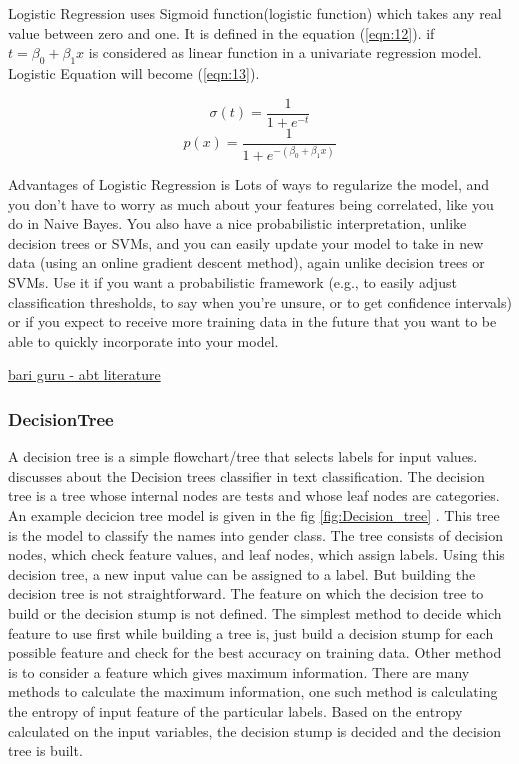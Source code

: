Logistic Regression uses Sigmoid function(logistic function) which takes any real value between zero and one. It is defined in the equation (\ref{eqn:12}). if $t= \beta_0 + \beta_1x$ is considered as linear function in a univariate regression model. Logistic Equation will become (\ref{eqn:13}). 




\begin{equation}
\label{eqn:12}
\sigma(t) = \frac{1}{1+e^{-t}}
\end{equation}
\begin{equation}
\label{eqn:13}
p(x) = \frac{1}{1 + e^{-(\beta_0 + \beta_1x)}}
\end{equation}



Advantages of Logistic Regression is Lots of ways to regularize the model, and you don’t have to worry as much about your features being correlated, like you do in Naive Bayes. You also have a nice probabilistic interpretation, unlike decision trees or SVMs, and you can easily update your model to take in new data (using an online gradient descent method), again unlike decision trees or SVMs. Use it if you want a probabilistic framework (e.g., to easily adjust classification thresholds, to say when you’re unsure, or to get confidence intervals) or if you expect to receive more training data in the future that you want to be able to quickly incorporate into your model.

\underline{bari guru - abt literature }

\subsubsection{DecisionTree}
A decision tree is a simple flowchart/tree that selects labels for input values. \cite{BirdKleinLoper09} discusses about the Decision trees classifier in text classification. The decision tree is a tree whose internal nodes are tests and whose leaf nodes are categories. An example decicion tree model is given in the fig \ref{fig:Decision_tree} . This tree is the model to classify the names into gender class. The tree consists of decision nodes, which check feature values, and leaf nodes, which assign labels. Using this decision tree, a new input value can be assigned to a label. But building the decision tree is not straightforward. The feature on which the decision tree to build or the decision stump is not defined. The simplest method to decide which feature to use first while building a tree is, just build a decision stump for each possible feature and check for the best accuracy on training data. Other method is to consider a feature which gives maximum information. There are many methods to calculate the maximum information, one such method is calculating the entropy of input feature of the particular labels. Based on the entropy calculated on the input variables, the decision stump is decided and the decision tree is built.

